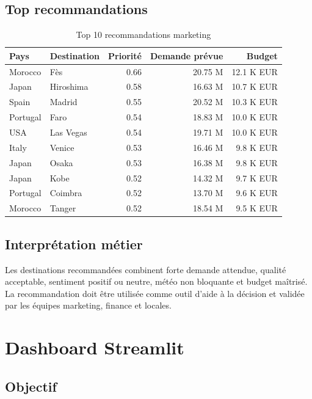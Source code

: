 \documentclass[11pt,a4paper]{report}
\begin{document}
\section{Top recommandations}

\begin{table}[H]
\centering
\caption{Top 10 recommandations marketing}
\begin{tabularx}{\textwidth}{llrrr}
\toprule
\textbf{Pays} & \textbf{Destination} & \textbf{Priorité} & \textbf{Demande prévue} & \textbf{Budget} \\
\midrule
Morocco & Fès & 0.66 & 20.75 M & 12.1 K EUR \\
Japan & Hiroshima & 0.58 & 16.63 M & 10.7 K EUR \\
Spain & Madrid & 0.55 & 20.52 M & 10.3 K EUR \\
Portugal & Faro & 0.54 & 18.83 M & 10.0 K EUR \\
USA & Las Vegas & 0.54 & 19.71 M & 10.0 K EUR \\
Italy & Venice & 0.53 & 16.46 M & 9.8 K EUR \\
Japan & Osaka & 0.53 & 16.38 M & 9.8 K EUR \\
Japan & Kobe & 0.52 & 14.32 M & 9.7 K EUR \\
Portugal & Coimbra & 0.52 & 13.70 M & 9.6 K EUR \\
Morocco & Tanger & 0.52 & 18.54 M & 9.5 K EUR \\
\bottomrule
\end{tabularx}
\end{table}

\section{Interprétation métier}

Les destinations recommandées combinent forte demande attendue, qualité acceptable, sentiment positif ou neutre, météo non bloquante et budget maîtrisé. La recommandation doit être utilisée comme outil d'aide à la décision et validée par les équipes marketing, finance et locales.

\chapter{Dashboard Streamlit}

\section{Objectif}
\end{document}
